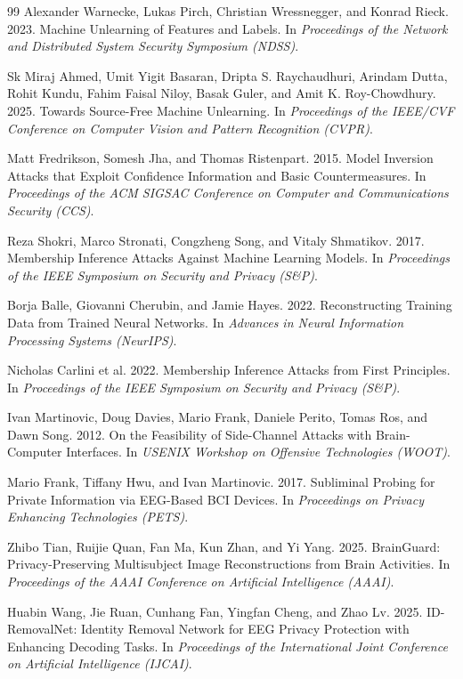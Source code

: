 \documentclass[10pt,twocolumn]{article}
\begin{document}
\begin{thebibliography}{99}
Alexander Warnecke, Lukas Pirch, Christian Wressnegger, and Konrad Rieck. 2023. Machine Unlearning of Features and Labels. In \emph{Proceedings of the Network and Distributed System Security Symposium (NDSS)}.

Sk Miraj Ahmed, Umit Yigit Basaran, Dripta S. Raychaudhuri, Arindam Dutta, Rohit Kundu, Fahim Faisal Niloy, Basak Guler, and Amit K. Roy-Chowdhury. 2025. Towards Source-Free Machine Unlearning. In \emph{Proceedings of the IEEE/CVF Conference on Computer Vision and Pattern Recognition (CVPR)}.

Matt Fredrikson, Somesh Jha, and Thomas Ristenpart. 2015. Model Inversion Attacks that Exploit Confidence Information and Basic Countermeasures. In \emph{Proceedings of the ACM SIGSAC Conference on Computer and Communications Security (CCS)}.

Reza Shokri, Marco Stronati, Congzheng Song, and Vitaly Shmatikov. 2017. Membership Inference Attacks Against Machine Learning Models. In \emph{Proceedings of the IEEE Symposium on Security and Privacy (S\&P)}.

Borja Balle, Giovanni Cherubin, and Jamie Hayes. 2022. Reconstructing Training Data from Trained Neural Networks. In \emph{Advances in Neural Information Processing Systems (NeurIPS)}.

Nicholas Carlini et al. 2022. Membership Inference Attacks from First Principles. In \emph{Proceedings of the IEEE Symposium on Security and Privacy (S\&P)}.

Ivan Martinovic, Doug Davies, Mario Frank, Daniele Perito, Tomas Ros, and Dawn Song. 2012. On the Feasibility of Side-Channel Attacks with Brain-Computer Interfaces. In \emph{USENIX Workshop on Offensive Technologies (WOOT)}.

Mario Frank, Tiffany Hwu, and Ivan Martinovic. 2017. Subliminal Probing for Private Information via EEG-Based BCI Devices. In \emph{Proceedings on Privacy Enhancing Technologies (PETS)}.

Zhibo Tian, Ruijie Quan, Fan Ma, Kun Zhan, and Yi Yang. 2025. BrainGuard: Privacy-Preserving Multisubject Image Reconstructions from Brain Activities. In \emph{Proceedings of the AAAI Conference on Artificial Intelligence (AAAI)}.

Huabin Wang, Jie Ruan, Cunhang Fan, Yingfan Cheng, and Zhao Lv. 2025. ID-RemovalNet: Identity Removal Network for EEG Privacy Protection with Enhancing Decoding Tasks. In \emph{Proceedings of the International Joint Conference on Artificial Intelligence (IJCAI)}.


\end{thebibliography}
\end{document}
